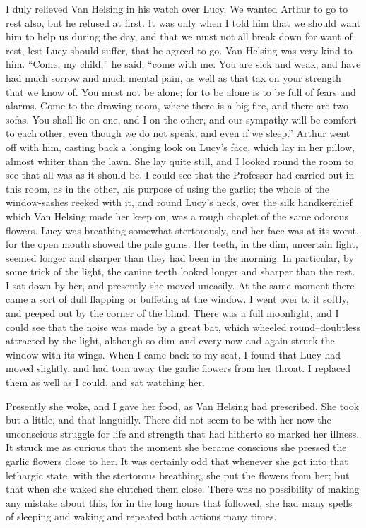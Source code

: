 \documentclass[12pt,openright]{book}
\begin{document}
I duly relieved Van Helsing in his watch over Lucy. We wanted Arthur to go to rest also, but he refused at first. It was only when I told him that we should want him to help us during the day, and that we must not all break down for want of rest, lest Lucy should suffer, that he agreed to go. Van Helsing was very kind to him. “Come, my child,” he said; “come with me. You are sick and weak, and have had much sorrow and much mental pain, as well as that tax on your strength that we know of. You must not be alone; for to be alone is to be full of fears and alarms. Come to the drawing-room, where there is a big fire, and there are two sofas. You shall lie on one, and I on the other, and our sympathy will be comfort to each other, even though we do not speak, and even if we sleep.” Arthur went off with him, casting back a longing look on Lucy’s face, which lay in her pillow, almost whiter than the lawn. She lay quite still, and I looked round the room to see that all was as it should be. I could see that the Professor had carried out in this room, as in the other, his purpose of using the garlic; the whole of the window-sashes reeked with it, and round Lucy’s neck, over the silk handkerchief which Van Helsing made her keep on, was a rough chaplet of the same odorous flowers. Lucy was breathing somewhat stertorously, and her face was at its worst, for the open mouth showed the pale gums. Her teeth, in the dim, uncertain light, seemed longer and sharper than they had been in the morning. In particular, by some trick of the light, the canine teeth looked longer and sharper than the rest. I sat down by her, and presently she moved uneasily. At the same moment there came a sort of dull flapping or buffeting at the window. I went over to it softly, and peeped out by the corner of the blind. There was a full moonlight, and I could see that the noise was made by a great bat, which wheeled round–doubtless attracted by the light, although so dim–and every now and again struck the window with its wings. When I came back to my seat, I found that Lucy had moved slightly, and had torn away the garlic flowers from her throat. I replaced them as well as I could, and sat watching her.

Presently she woke, and I gave her food, as Van Helsing had prescribed. She took but a little, and that languidly. There did not seem to be with her now the unconscious struggle for life and strength that had hitherto so marked her illness. It struck me as curious that the moment she became conscious she pressed the garlic flowers close to her. It was certainly odd that whenever she got into that lethargic state, with the stertorous breathing, she put the flowers from her; but that when she waked she clutched them close. There was no possibility of making any mistake about this, for in the long hours that followed, she had many spells of sleeping and waking and repeated both actions many times.
\end{document}
